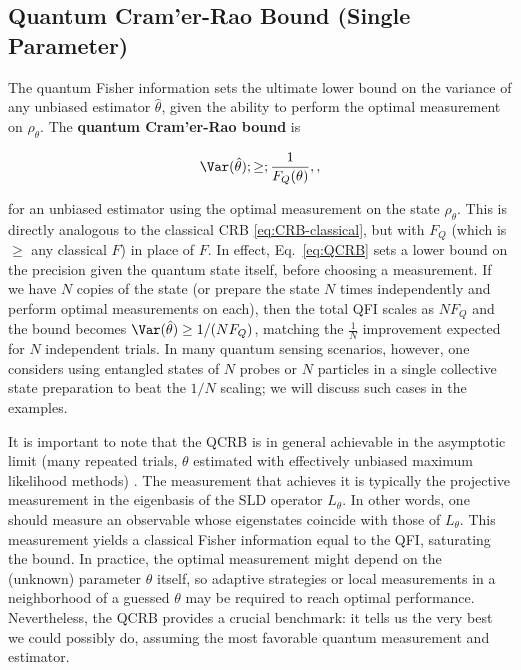 \subsection{Quantum Cram'er-Rao Bound (Single Parameter)}



The quantum Fisher information sets the ultimate lower bound on the
variance of any unbiased estimator $\hat{\theta}$, given the ability
to perform the optimal measurement on $\rho_\theta$. The
\textbf{quantum Cram'er-Rao bound} is

\begin{equation}
\Var(\hat{\theta}) ;\ge; \frac{1}{F_Q(\theta)} ,,
\label{eq:QCRB}
\end{equation}

for an unbiased estimator using the optimal measurement on the state
$\rho_\theta$. This is directly analogous to the classical CRB
\eqref{eq:CRB-classical}, but with $F_Q$ (which is $\ge$ any classical
$F$) in place of $F$. In effect, Eq.~\eqref{eq:QCRB} sets a lower
bound on the precision given the quantum state itself, before choosing
a measurement. If we have $N$ copies of the state (or prepare the
state $N$ times independently and perform optimal measurements on
each), then the total QFI scales as $N F_Q$ and the bound becomes
$\Var(\hat{\theta}) \ge 1/(N F_Q)$, matching the $\frac{1}{N}$
improvement expected for $N$ independent trials. In many quantum
sensing scenarios, however, one considers using entangled states of
$N$ probes or $N$ particles in a single collective state preparation
to beat the $1/N$ scaling; we will discuss such cases in the examples.



It is important to note that the QCRB is in general achievable in the
asymptotic limit (many repeated trials, $\theta$ estimated with
effectively unbiased maximum likelihood methods)
\cite{BraunsteinCaves1994, Helstrom1976}. The measurement that
achieves it is typically the projective measurement in the eigenbasis
of the SLD operator $L_\theta$. In other words, one should measure an
observable whose eigenstates coincide with those of $L_\theta$. This
measurement yields a classical Fisher information equal to the QFI,
saturating the bound. In practice, the optimal measurement might
depend on the (unknown) parameter $\theta$ itself, so adaptive
strategies or local measurements in a neighborhood of a guessed
$\theta$ may be required to reach optimal performance. Nevertheless,
the QCRB provides a crucial benchmark: it tells us the very best we
could possibly do, assuming the most favorable quantum measurement and
estimator.



